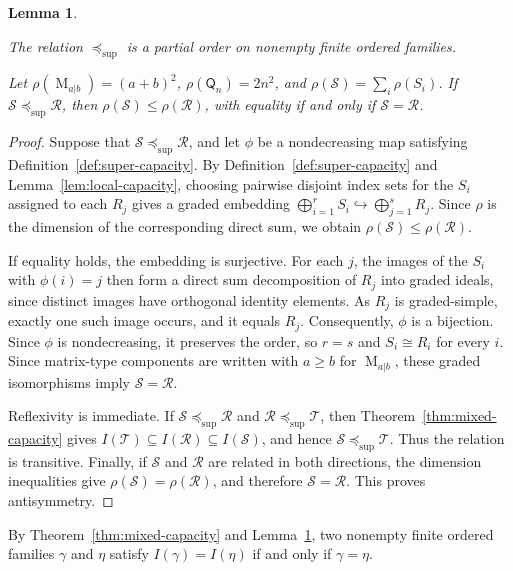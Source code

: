 \documentclass[11pt,reqno]{amsart}
\newcommand{\Mat}{\operatorname{M}}
\newcommand{\Qtype}{\mathsf Q}
\newtheorem{lemma}[theorem]{Lemma}
\theoremstyle{definition}
\theoremstyle{remark}
\numberwithin{equation}{section}
\begin{document}
\begin{lemma}\label{lem:capacity-order}

The relation $\preceq_{\mathrm{sup}}$ is a partial order
on nonempty finite ordered families.

Let
$
\rho(\Mat_{a|b})=(a+b)^2$,
$\rho(\Qtype_n)=2n^2$, and $
\rho(\mathcal S)=\sum_i\rho(S_i)$.
If $\mathcal S\preceq_{\mathrm{sup}}\mathcal R$, then
$\rho(\mathcal S)\leq\rho(\mathcal R)$, with equality
if and only if $\mathcal S=\mathcal R$.

\end{lemma}
\begin{proof}
Suppose that $\mathcal S\preceq_{\mathrm{sup}}\mathcal R$,
and let $\phi$ be a nondecreasing map satisfying
Definition~\ref{def:super-capacity}.
By Definition~\ref{def:super-capacity} and
Lemma~\ref{lem:local-capacity}, choosing pairwise disjoint
index sets for the $S_i$ assigned to each $R_j$
gives a graded embedding
$
\bigoplus_{i=1}^r S_i
\hookrightarrow
\bigoplus_{j=1}^s R_j$.
Since $\rho$ is the dimension of the corresponding
direct sum, we obtain
$\rho(\mathcal S)\leq\rho(\mathcal R)$.

If equality holds, the embedding is surjective.
For each $j$, the images of the $S_i$ with
$\phi(i)=j$ then form a direct sum decomposition
of $R_j$ into graded ideals, since distinct images
have orthogonal identity elements.
As $R_j$ is graded-simple, exactly one such image
occurs, and it equals $R_j$.
Consequently, $\phi$ is a bijection.
Since $\phi$ is nondecreasing, it preserves the order,
so $r=s$ and $S_i\cong R_i$ for every $i$.
Since matrix-type components are written with
$a\geq b$ for $\Mat_{a|b}$, these graded isomorphisms
imply $\mathcal S=\mathcal R$.

Reflexivity is immediate.
If $\mathcal S\preceq_{\mathrm{sup}}\mathcal R$
and $\mathcal R\preceq_{\mathrm{sup}}\mathcal T$,
then Theorem~\ref{thm:mixed-capacity} gives
$
I(\mathcal T)\subseteq I(\mathcal R)
\subseteq I(\mathcal S)$,
and hence $\mathcal S\preceq_{\mathrm{sup}}\mathcal T$.
Thus the relation is transitive.
Finally, if $\mathcal S$ and $\mathcal R$ are related
in both directions, the dimension inequalities give
$\rho(\mathcal S)=\rho(\mathcal R)$, and therefore
$\mathcal S=\mathcal R$.
This proves antisymmetry.
\end{proof}

By Theorem~\ref{thm:mixed-capacity} and
Lemma~\ref{lem:capacity-order}, two nonempty finite ordered families
$\gamma$ and $\eta$ satisfy $I(\gamma)=I(\eta)$
if and only if $\gamma=\eta$.
\end{document}
